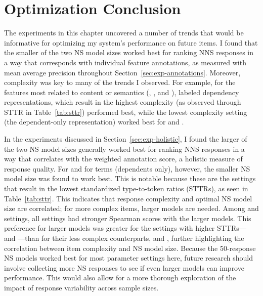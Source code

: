\section{Optimization Conclusion}
\label{sec:optimization-conclusion}
The experiments in this chapter uncovered a number of trends that would be informative for optimizing my system's performance on future items. I found that the smaller of the two NS model sizes worked best for ranking NNS responses in a way that corresponds with individual feature annotations, as measured with mean average precision throughout Section~\ref{sec:exp-annotations}. Moreover, complexity was key to many of the trends I observed. For example, for the features most related to content or semantics (, , and ), labeled dependency representations, which result in the highest complexity (as observed through STTR in Table~\ref{tab:sttr}) performed best, while the lowest complexity setting (the dependent-only representation) worked best for  and .

In the experiments discussed in Section~\ref{sec:exp-holistic}, I found the larger of the two NS model sizes generally worked best for ranking NNS responses in a way that correlates with the weighted annotation score, a holistic measure of response quality. For  and for  terms (dependents only), however, the smaller NS model size was found to work best. This is notable because these are the settings that result in the lowest standardized type-to-token ratios (STTRs), as seen in Table~\ref{tab:sttr}. This indicates that response complexity and optimal NS model size are correlated; for more complex items, larger models are needed. Among  and  settings, all settings had stronger Spearman scores with the larger models. This preference for larger models was greater for the settings with higher STTRs--- and ---than for their less complex counterparts,  and , further highlighting the correlation between item complexity and NS model size. Because the 50-response NS models worked best for most parameter settings here, future research should involve collecting more NS responses to see if even larger models can improve performance. This would also allow for a more thorough exploration of the impact of response variability across sample sizes.

